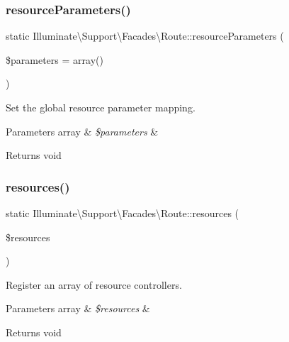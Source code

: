 \subsubsection{\texorpdfstring{resource\+Parameters()}{resourceParameters()}}
{\footnotesize\ttfamily static Illuminate\textbackslash{}\+Support\textbackslash{}\+Facades\textbackslash{}\+Route\+::resource\+Parameters (\begin{DoxyParamCaption}\item[{}]{\$parameters = {\ttfamily array()} }\end{DoxyParamCaption})\hspace{0.3cm}{\ttfamily [static]}}

Set the global resource parameter mapping.


\begin{DoxyParams}[1]{Parameters}
array & {\em \$parameters} & \\
\hline
\end{DoxyParams}
\begin{DoxyReturn}{Returns}
void 
\end{DoxyReturn}
\mbox{\label{class_illuminate_1_1_support_1_1_facades_1_1_route_a474685a13bb6afbb588369b5abae1885}} 
\subsubsection{\texorpdfstring{resources()}{resources()}}
{\footnotesize\ttfamily static Illuminate\textbackslash{}\+Support\textbackslash{}\+Facades\textbackslash{}\+Route\+::resources (\begin{DoxyParamCaption}\item[{}]{\$resources }\end{DoxyParamCaption})\hspace{0.3cm}{\ttfamily [static]}}

Register an array of resource controllers.


\begin{DoxyParams}[1]{Parameters}
array & {\em \$resources} & \\
\hline
\end{DoxyParams}
\begin{DoxyReturn}{Returns}
void 
\end{DoxyReturn}
\mbox{\label{class_illuminate_1_1_support_1_1_facades_1_1_route_a7e9d53bbab3ce3e9711d0eeb9643dc32}} 
